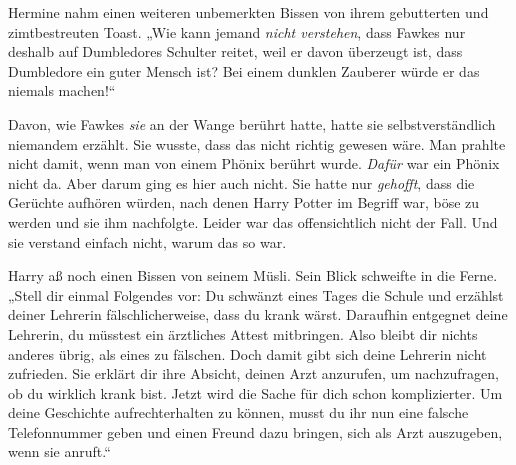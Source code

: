 Hermine nahm einen weiteren unbemerkten Bissen von ihrem gebutterten und zimtbestreuten Toast. „Wie kann jemand \emph{nicht verstehen}, dass Fawkes nur deshalb auf Dumbledores Schulter reitet, weil er davon überzeugt ist, dass Dumbledore ein guter Mensch ist? Bei einem dunklen Zauberer würde er das niemals machen!“

Davon, wie Fawkes \emph{sie} an der Wange berührt hatte, hatte sie selbstverständlich niemandem erzählt. Sie wusste, dass das nicht richtig gewesen wäre. Man prahlte nicht damit, wenn man von einem Phönix berührt wurde. \emph{Dafür} war ein Phönix nicht da.
%
%
%
Aber darum ging es hier auch nicht. Sie hatte nur \emph{gehofft}, dass die Gerüchte aufhören würden, nach denen Harry Potter im Begriff war, böse zu werden und sie ihm nachfolgte.
%
Leider war das offensichtlich nicht der Fall.
%
Und sie verstand einfach nicht, warum das so war.

Harry aß noch einen Bissen von seinem Müsli. Sein Blick schweifte in die Ferne. „Stell dir einmal Folgendes vor: Du schwänzt eines Tages die Schule und erzählst deiner Lehrerin fälschlicherweise, dass du krank wärst. Daraufhin entgegnet deine Lehrerin, du müsstest ein ärztliches Attest mitbringen. Also bleibt dir nichts anderes übrig, als eines zu fälschen. Doch damit gibt sich deine Lehrerin nicht zufrieden. Sie erklärt dir ihre Absicht, deinen Arzt anzurufen, um nachzufragen, ob du wirklich krank bist. Jetzt wird die Sache für dich schon komplizierter. Um deine Geschichte aufrechterhalten zu können, musst du ihr nun eine falsche Telefonnummer geben und einen Freund dazu bringen, sich als Arzt auszugeben, wenn sie anruft.“

